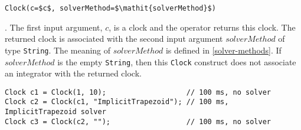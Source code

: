 \begin{operatordefinition*}[Clock]\label{modelica:clock-solver}
\begin{synopsis}\begin{lstlisting}
Clock(c=$c$, solverMethod=$\mathit{solverMethod}$)
\end{lstlisting}\end{synopsis}
\begin{semantics}
.
The first input argument, $c$, is a clock and the operator returns this clock.
The returned clock is associated with the second input argument $\mathit{solverMethod}$ of type \lstinline!String!.
The meaning of $\mathit{solverMethod}$ is defined in \cref{solver-methods}.
If $\mathit{solverMethod}$ is the empty \lstinline!String!, then this \lstinline!Clock! construct does not associate an integrator with the returned clock.

\begin{example}
\begin{lstlisting}[language=modelica]
Clock c1 = Clock(1, 10);                   // 100 ms, no solver
Clock c2 = Clock(c1, "ImplicitTrapezoid"); // 100 ms, ImplicitTrapezoid solver
Clock c3 = Clock(c2, "");                  // 100 ms, no solver
\end{lstlisting}
\end{example}
\end{semantics}
\end{operatordefinition*}

